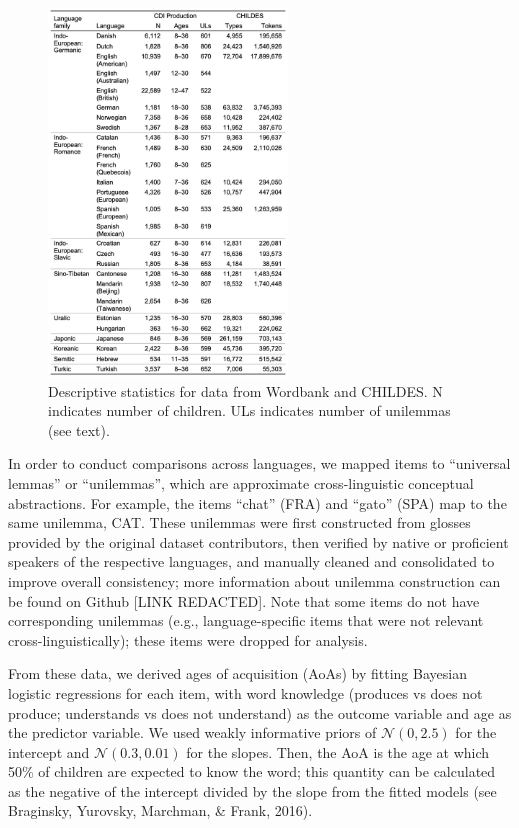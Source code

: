 \documentclass[10pt, letterpaper]{article}
\newenvironment{CodeChunk}{}{}
\begin{document}
\begin{CodeChunk}
\begin{figure}[ht]

{\centering \includegraphics[width=240px]{figs/descriptives}

}

\caption[Descriptive statistics for data from Wordbank and CHILDES]{Descriptive statistics for data from Wordbank and CHILDES. N indicates number of children. ULs indicates number of unilemmas (see text).}\label{fig:descriptives}
\end{figure}
\end{CodeChunk}

In order to conduct comparisons across languages, we mapped items to
``universal lemmas'' or ``unilemmas'', which are approximate
cross-linguistic conceptual abstractions. For example, the items
``chat'' (FRA) and ``gato'' (SPA) map to the same unilemma, CAT. These
unilemmas were first constructed from glosses provided by the original
dataset contributors, then verified by native or proficient speakers of
the respective languages, and manually cleaned and consolidated to
improve overall consistency; more information about unilemma
construction can be found on Github {[}LINK REDACTED{]}. Note that some
items do not have corresponding unilemmas (e.g., language-specific items
that were not relevant cross-linguistically); these items were dropped
for analysis.

From these data, we derived ages of acquisition (AoAs) by fitting
Bayesian logistic regressions for each item, with word knowledge
(produces vs does not produce; understands vs does not understand) as
the outcome variable and age as the predictor variable. We used weakly
informative priors of \(\mathcal{N}(0, 2.5)\) for the intercept and
\(\mathcal{N}(0.3, 0.01)\) for the slopes. Then, the AoA is the age at
which 50\% of children are expected to know the word; this quantity can
be calculated as the negative of the intercept divided by the slope from
the fitted models (see Braginsky, Yurovsky, Marchman, \& Frank, 2016).
\end{document}
